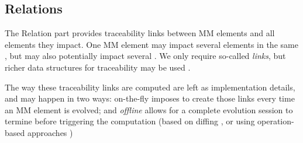 \subsection{Relations}
\label{sec:Suggestion:Relation}

The \textsf{Relation} part provides traceability links between \textsf{MM}
elements and all \viewtype elements they impact. One \textsf{MM} element
may impact several elements in the same \viewtype, but may also potentially
impact several \viewtypes. We only require so-called \emph{links}, but richer
data structures for traceability may be used \autocite{Batot-Cabot-Gerard:2021}.

The way these traceability links are computed are left as implementation
details, and may happen in two ways: \textsf{on-the-fly} imposes to create
those links every time an \textsf{MM} element is evolved; and \emph{offline}
allows for a complete evolution session to termine before triggering the
computation (based on diffing \autocite{Kehrer-Kelter-Taentzer:2011}, or using 
operation-based approaches \parencite{J:Lippe-Oosterom:1992})